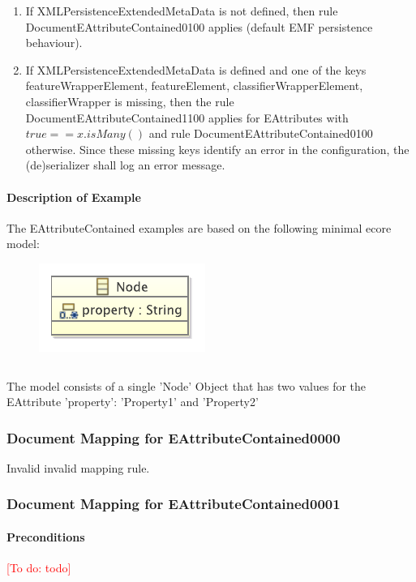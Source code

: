 \documentclass[11pt,a4paper]{article}
\newcommand{\addtodo}[1]{\textcolor{red}{[To do: #1]}\index{TODO: #1}}
\begin{document}
\begin{enumerate}
\item If XMLPersistenceExtendedMetaData is not defined, then rule DocumentEAttributeContained0100 applies (default EMF persistence behaviour).

\item If XMLPersistenceExtendedMetaData is defined and one of the keys featureWrapperElement, featureElement, classifierWrapperElement, classifierWrapper is missing, then the rule DocumentEAttributeContained1100 applies for EAttributes with $true==x.isMany()$ and rule DocumentEAttributeContained0100 otherwise. Since these missing keys identify an error in the configuration, the (de)serializer shall log an error message.
\end{enumerate}

\paragraph{Description of Example}
The EAttributeContained examples are based on the following minimal ecore model:

\begin{figure}[h]
\centering
\includegraphics[]{examples/EAttributeContained.pdf}
\end{figure}

\inputminted[firstline=15, fontsize=\footnotesize]{java}{examples/EAttributeContained.xcore}

The model consists of a single 'Node' Object that has two values for the EAttribute 'property': 'Property1' and 'Property2'

\subsubsection{Document Mapping for EAttributeContained0000}
Invalid invalid mapping rule.

\subsubsection{Document Mapping for EAttributeContained0001}
\paragraph{Preconditions}
\addtodo{todo}
\end{document}
